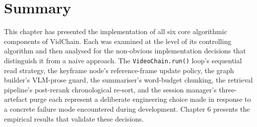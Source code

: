 \section{Summary}

This chapter has presented the implementation of all six core algorithmic components of VidChain. Each was examined at the level of its controlling algorithm and then analysed for the non-obvious implementation decisions that distinguish it from a naive approach. The \texttt{VideoChain.run()} loop's sequential read strategy, the keyframe node's reference-frame update policy, the graph builder's VLM-prose guard, the summariser's word-budget chunking, the retrieval pipeline's post-rerank chronological re-sort, and the session manager's three-artefact purge each represent a deliberate engineering choice made in response to a concrete failure mode encountered during development. Chapter 6 presents the empirical results that validate these decisions.
